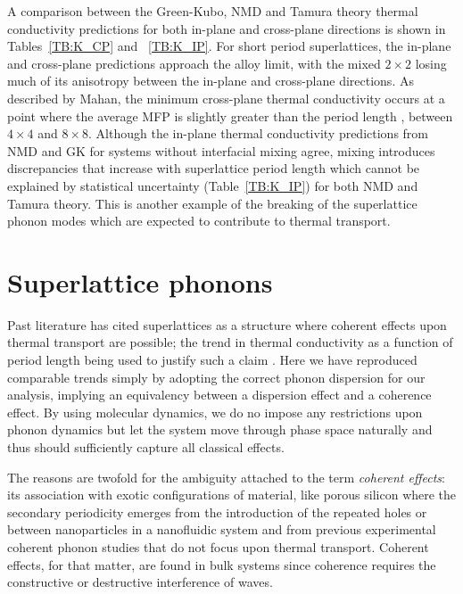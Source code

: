\documentclass[aps,prb,preprint,preprintnumbers,amsmath,amssymb,floatfix,superscriptaddress]{revtex4}
\begin{document}
A comparison between the Green-Kubo, NMD and Tamura theory thermal conductivity predictions for both in-plane and cross-plane directions is shown in Tables~\ref{TB:K_CP} and ~\ref{TB:K_IP}. For short period superlattices, the in-plane and cross-plane predictions approach the alloy limit, with the mixed $2\times 2$ losing much of its anisotropy between the in-plane and cross-plane directions. As described by Mahan, the minimum cross-plane thermal conductivity occurs at a point where the average MFP is slightly greater than the period length \cite{PhysRevLett.84.927}, between $4 \times 4$ and $8 \times 8$. Although the in-plane thermal conductivity predictions from NMD and GK for systems without interfacial mixing agree, mixing introduces discrepancies that increase with superlattice period length which cannot be explained by statistical uncertainty (Table~\ref{TB:K_IP}) for both NMD and Tamura theory. This is another example of the breaking of the superlattice phonon modes which are expected to contribute to thermal transport.

\section{Superlattice phonons}

Past literature has cited superlattices as a structure where coherent effects upon thermal transport are possible; the trend in thermal conductivity as a function of period length being used to justify such a claim \cite{PhysRevB.67.195311,PhysRevB.72.174302,PhysRevB.61.3091}. Here we have reproduced comparable trends simply by adopting the correct phonon dispersion for our analysis, implying an equivalency between a dispersion effect and a coherence effect. By using molecular dynamics, we do no impose any restrictions upon phonon dynamics but let the system move through phase space naturally and thus should sufficiently capture all classical effects.

The reasons are twofold for the ambiguity attached to the term \textit {coherent effects}: its association with exotic configurations of material, like porous silicon \cite{doi:10.1021/nl102918q} where the secondary periodicity emerges from the introduction of the repeated holes or between nanoparticles in a nanofluidic system \cite{Keblinski2002855} and from previous experimental coherent phonon studies \cite{PhysRevLett.73.740,PhysRevB.75.195309} that do not focus upon thermal transport. Coherent effects, for that matter, are found in bulk systems since coherence requires the constructive or destructive interference of waves.
\end{document}
